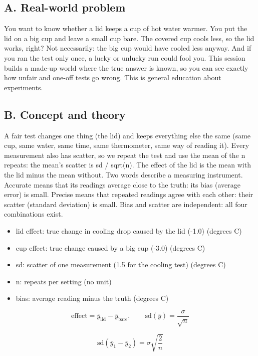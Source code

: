 \documentclass[11pt,a4paper]{article}
\begin{document}
\subsection*{A. Real-world problem}
You want to know whether a lid keeps a cup of hot water warmer. You put the lid on a big cup and leave a small cup bare. The covered cup cools less, so the lid works, right? Not necessarily: the big cup would have cooled less anyway. And if you ran the test only once, a lucky or unlucky run could fool you. This session builds a made-up world where the true answer is known, so you can see exactly how unfair and one-off tests go wrong. This is general education about experiments.

\subsection*{B. Concept and theory}
A fair test changes one thing (the lid) and keeps everything else the same (same cup, same water, same time, same thermometer, same way of reading it). Every measurement also has scatter, so we repeat the test and use the mean of the n repeats: the mean's scatter is sd / sqrt(n). The effect of the lid is the mean with the lid minus the mean without. Two words describe a measuring instrument. Accurate means that its readings average close to the truth: its bias (average error) is small. Precise means that repeated readings agree with each other: their scatter (standard deviation) is small. Bias and scatter are independent: all four combinations exist.

\begin{itemize}[nosep]
\item lid effect: true change in cooling drop caused by the lid (-1.0) (degrees C)
\item cup effect: true change caused by a big cup (-3.0) (degrees C)
\item sd: scatter of one measurement (1.5 for the cooling test) (degrees C)
\item n: repeats per setting (no unit)
\item bias: average reading minus the truth (degrees C)
\end{itemize}

\begin{equation*}
\text{effect}=\bar y_{\text{lid}}-\bar y_{\text{bare}},\qquad \mathrm{sd}(\bar y)=\frac{\sigma}{\sqrt n}
\end{equation*}

\begin{equation*}
\mathrm{sd}(\bar y_1-\bar y_2)=\sigma\sqrt{\frac{2}{n}}
\end{equation*}
\end{document}
